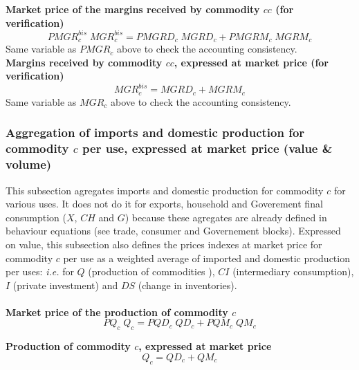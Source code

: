 \documentclass[12pt]{article}
\numberwithin{equation}{section}
\begin{document}
\noindent\textbf{Market price of the margins received by commodity $cc$ (for verification)} \\
\begin{dmath}
PMGR^{bis}_{c} \; MGR^{bis}_{c} = PMGRD_{c} \; MGRD_{c} + PMGRM_{c} \; MGRM_{c}
\end{dmath}
Same variable as $PMGR_{c}$ above to check the accounting consistency. \\

\noindent\textbf{Margins received by commodity $cc$, expressed at market price (for verification)} \\
\begin{dmath}
MGR^{bis}_{c} = MGRD_{c} + MGRM_{c}
\end{dmath}
Same variable as $MGR_{c}$ above to check the accounting consistency. \\



\subsubsection{Aggregation of imports and domestic production for commodity $c$ per use, expressed at market price (value \& volume)}


This subsection agregates imports and domestic production for commodity $c$ for various uses. It does not do it for exports, household and Goverement final consumption ($X$, $CH$ and $G$) because these agregates are already defined in behaviour equations (see trade, consumer and Governement blocks). Expressed on value, this subsection also defines the prices indexes at market price for commodity $c$ per use as a weighted average of imported and domestic production per uses: \textit{i.e.} for $Q$ (production of commodities ), $CI$ (intermediary consumption), $I$ (private investment) and $DS$ (change in inventories). \\
 \\

\noindent\textbf{Market price of the production of commodity $c$} \\
\begin{dmath}
PQ_{c} \; Q_{c} = PQD_{c} \; QD_{c} + PQM_{c} \; QM_{c}
\end{dmath}

\noindent\textbf{Production of commodity $c$, expressed at market price} \\
\begin{dmath}
Q_{c} = QD_{c} + QM_{c}
\end{dmath}
\end{document}
